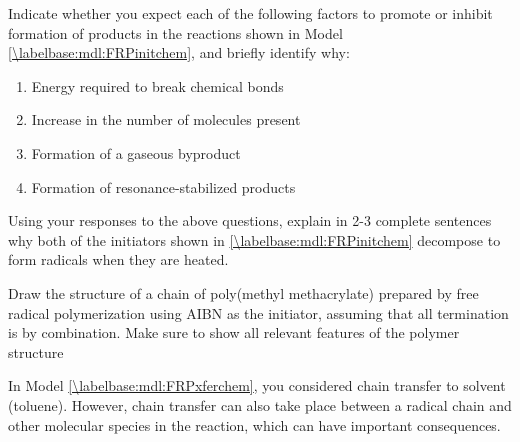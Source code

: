 \begin{activity}
\begin{exercises}

	\exercise Indicate whether you expect each of the following factors to promote or inhibit formation of products in the reactions shown in Model \ref{\labelbase:mdl:FRPinitchem}, and briefly identify why: %
	
		\begin{enumerate}
			\item Energy required to break chemical bonds
	
			
			\item Increase in the number of molecules present
	
			
			\item Formation of a gaseous byproduct
	
			
			\item Formation of resonance-stabilized products
	
		\end{enumerate}
		
		Using your responses to the above questions, explain in 2-3 complete sentences why both of the initiators shown in \ref{\labelbase:mdl:FRPinitchem} decompose to form radicals when they are heated.
		
	

	\exercise Draw the structure of a chain of poly(methyl methacrylate) prepared by free radical polymerization using AIBN as the initiator, assuming that all termination is by combination.  Make sure to show all relevant features of the polymer structure
	
	\exercise In Model \ref{\labelbase:mdl:FRPxferchem}, you considered chain transfer to solvent (toluene).  However, chain transfer can also take place between a radical chain and other molecular species in the reaction, which can have important consequences.
	

\end{exercises}
\end{activity}
